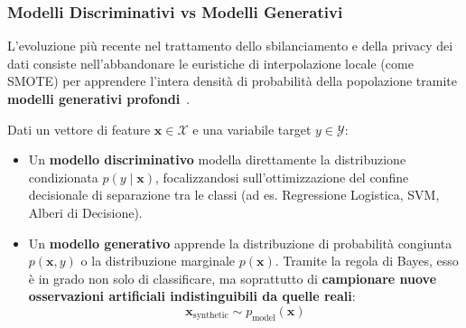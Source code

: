 \FloatBarrier
\subsubsection{Modelli Discriminativi vs Modelli Generativi}
\label{subsec:dm-disc-vs-gen}

L'evoluzione più recente nel trattamento dello sbilanciamento e della privacy dei dati consiste nell'abbandonare le euristiche di interpolazione locale (come SMOTE) per apprendere l'intera densità di probabilità della popolazione tramite \textbf{modelli generativi profondi}~\cite{mannocci2026imbalanced}.

\begin{definition}
Dati un vettore di feature $\mathbf{x} \in \mathcal{X}$ e una variabile target $y \in \mathcal{Y}$:
\begin{itemize}
    \item Un \textbf{modello discriminativo} modella direttamente la distribuzione condizionata $p(y \mid \mathbf{x})$, focalizzandosi sull'ottimizzazione del confine decisionale di separazione tra le classi (ad es. Regressione Logistica, SVM, Alberi di Decisione).
    \item Un \textbf{modello generativo} apprende la distribuzione di probabilità congiunta $p(\mathbf{x}, y)$ o la distribuzione marginale $p(\mathbf{x})$. Tramite la regola di Bayes, esso è in grado non solo di classificare, ma soprattutto di \textbf{campionare nuove osservazioni artificiali indistinguibili da quelle reali}:
    \begin{equation}
        \mathbf{x}_{\text{synthetic}} \sim p_{\text{model}}(\mathbf{x})
    \end{equation}
\end{itemize}
\end{definition}

\begin{table}[H]
\centering
\caption{Evoluzione paradigmatica dei metodi di sovracampionamento e generazione sintetica.}
\label{tab:dm-gen-evolution}
\vspace{2mm}
\end{table}

